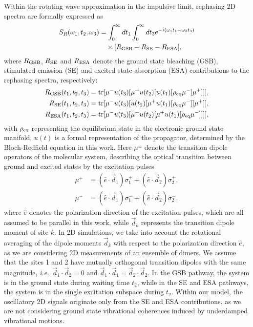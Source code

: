 \documentclass[%
 reprint,%
 amssymb, amsmath,%
 aip,cha,%
]{revtex4-1}
\begin{document}
Within the rotating wave approximation in the impulsive limit, rephasing 2D spectra are formally expressed as
\begin{align}
S_{R}(\omega_1,t_2,\omega_3)&=\int_{0}^{\infty}dt_{1}\int_{0}^{\infty}dt_{3}e^{-i(\omega_1 t_1-\omega_3 t_3)}\\
&\quad\times[R_{\rm GSB}+R_{\rm SE}-R_{\rm ESA}],\nonumber
\end{align}
where $R_{\rm GSB}$, $R_{\rm SE}$ and $R_{\rm ESA}$ denote the ground state bleaching (GSB), stimulated emission (SE) and excited state absorption (ESA) contributions to the rephasing spectra, respectively:
\begin{align}
R_{\rm GSB}(t_1,t_2,t_3)&={\rm tr}[\mu^{-}u(t_3)[\mu^{+}u(t_2)[u(t_1)[\rho_{\rm eq}\mu^{-}]\mu^{+}]]],\label{eq:RGSB}\\
R_{\rm SE}(t_1,t_2,t_3)&={\rm tr}[\mu^{-}u(t_3)[u(t_2)[\mu^{+}u(t_1)[\rho_{\rm eq}\mu^{-}]]\mu^{+}]],\label{eq:RSE}\\
R_{\rm ESA}(t_1,t_2,t_3)&={\rm tr}[\mu^{-}u(t_3)[\mu^{+}u(t_2)[\mu^{+}u(t_1)[\rho_{\rm eq}\mu^{-}]]]],\label{eq:RESA}
\end{align}
with $\rho_{\rm eq}$ representing the equilibrium state in the electronic ground state manifold, $u(t)$ is a formal representation of the propagator, determined by the Bloch-Redfield equation in this work.  Here $\mu^{\pm}$ denote the transition dipole operators of the molecular system, describing the optical transition between ground and excited states by the excitation pulses
\begin{align}
\mu^{+}&=(\hat{e}\cdot\vec{d}_{1})\sigma_{1}^{+}+(\hat{e}\cdot\vec{d}_{2})\sigma_{2}^{+},\label{eq:mup}\\
\mu^{-}&=(\hat{e}\cdot\vec{d}_{1})\sigma_{1}^{-}+(\hat{e}\cdot\vec{d}_{2})\sigma_{2}^{-},\label{eq:mum}
\end{align}
where $\hat{e}$ denotes the polarization direction of the excitation pulses, which are all assumed to be parallel in this work, while $\vec{d}_k$ represents the transition dipole moment of site $k$. In 2D simulations, we take into account the rotational averaging of the dipole moments $\vec{d}_k$ with respect to the polarization direction $\hat{e}$, as we are considering 2D measurements of an ensemble of dimers. We assume that the sites 1 and 2 have mutually orthogonal transition dipoles with the same magnitude, {\it i.e.}~$\vec{d}_{1}\cdot\vec{d}_{2}=0$ and $\vec{d}_{1}\cdot\vec{d}_{1}=\vec{d}_{2}\cdot\vec{d}_{2}$. In the GSB pathway, the system is in the ground state during waiting time $t_2$, while in the SE and ESA pathways, the system is in the single excitation subspace during $t_2$. Within our model, the oscillatory 2D signals originate only from the SE and ESA contributions, as we are not considering ground state vibrational coherences induced by underdamped vibrational motions.
\end{document}
